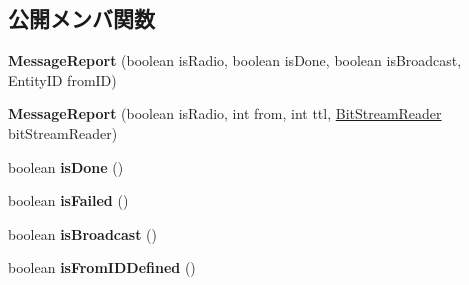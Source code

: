 \subsection*{公開メンバ関数}
\begin{DoxyCompactItemize}
\item 
\hypertarget{classadf_1_1agent_1_1communication_1_1standard_1_1bundle_1_1topdown_1_1MessageReport_a9ade58ec0aa0cb99bd8c241964296896}{}\label{classadf_1_1agent_1_1communication_1_1standard_1_1bundle_1_1topdown_1_1MessageReport_a9ade58ec0aa0cb99bd8c241964296896} 
{\bfseries Message\+Report} (boolean is\+Radio, boolean is\+Done, boolean is\+Broadcast, Entity\+ID from\+ID)
\item 
\hypertarget{classadf_1_1agent_1_1communication_1_1standard_1_1bundle_1_1topdown_1_1MessageReport_aa6ad7e2e011615f7d97d928eb3335a90}{}\label{classadf_1_1agent_1_1communication_1_1standard_1_1bundle_1_1topdown_1_1MessageReport_aa6ad7e2e011615f7d97d928eb3335a90} 
{\bfseries Message\+Report} (boolean is\+Radio, int from, int ttl, \hyperlink{classadf_1_1component_1_1communication_1_1util_1_1BitStreamReader}{Bit\+Stream\+Reader} bit\+Stream\+Reader)
\item 
\hypertarget{classadf_1_1agent_1_1communication_1_1standard_1_1bundle_1_1topdown_1_1MessageReport_abe678c02ccff8051826035c3801e563f}{}\label{classadf_1_1agent_1_1communication_1_1standard_1_1bundle_1_1topdown_1_1MessageReport_abe678c02ccff8051826035c3801e563f} 
boolean {\bfseries is\+Done} ()
\item 
\hypertarget{classadf_1_1agent_1_1communication_1_1standard_1_1bundle_1_1topdown_1_1MessageReport_a39c887dcc705ac428e4c91319af1ad00}{}\label{classadf_1_1agent_1_1communication_1_1standard_1_1bundle_1_1topdown_1_1MessageReport_a39c887dcc705ac428e4c91319af1ad00} 
boolean {\bfseries is\+Failed} ()
\item 
\hypertarget{classadf_1_1agent_1_1communication_1_1standard_1_1bundle_1_1topdown_1_1MessageReport_a5984bbe2cb0e3332414a1550ae0eaa55}{}\label{classadf_1_1agent_1_1communication_1_1standard_1_1bundle_1_1topdown_1_1MessageReport_a5984bbe2cb0e3332414a1550ae0eaa55} 
boolean {\bfseries is\+Broadcast} ()
\item 
\hypertarget{classadf_1_1agent_1_1communication_1_1standard_1_1bundle_1_1topdown_1_1MessageReport_a3b89f0c5eb8838e91accd99c3baaf43b}{}\label{classadf_1_1agent_1_1communication_1_1standard_1_1bundle_1_1topdown_1_1MessageReport_a3b89f0c5eb8838e91accd99c3baaf43b} 
boolean {\bfseries is\+From\+I\+D\+Defined} ()
\item 

\end{DoxyCompactItemize}

